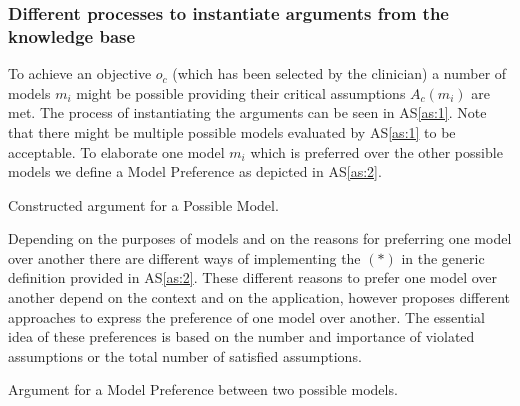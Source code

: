\subsubsection*{Different processes to instantiate arguments from the knowledge base}

To achieve an objective $o_c$ (which has been selected by the clinician) a number of models $m_i$ might be possible providing their critical assumptions $A_c(m_i)$ are met. The process of instantiating the arguments can be seen in AS\autoref{as:1}. Note that there might be multiple possible models evaluated by AS\ref{as:1} to be acceptable. To elaborate one model $m_i$ which is preferred over the other possible models we define a Model Preference as depicted in AS\ref{as:2}.

\begin{AS}[h]
\centering
	\caption{Constructed argument for a Possible Model.\label{as:1}}
\end{AS}

Depending on the purposes of models and on the reasons for preferring one model over another there are different ways of implementing the $(\ast)$ in the generic definition provided in AS\ref{as:2}. These different reasons to prefer one model over another depend on the context and on the application, however \cite{sassoon2014} proposes different approaches to express the preference of one model over another. The essential idea of these preferences is based on the number and importance of violated assumptions or the total number of satisfied assumptions. 

\begin{AS}[h]
\centering
	\caption{Argument for a Model Preference between two possible models.\label{as:2}}

\end{AS}


